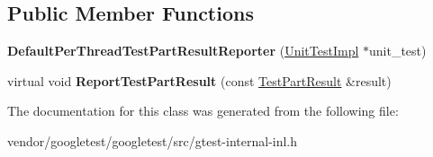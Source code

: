 \subsection*{Public Member Functions}
\begin{DoxyCompactItemize}
\item 
{\bfseries Default\+Per\+Thread\+Test\+Part\+Result\+Reporter} (\hyperlink{classtesting_1_1internal_1_1UnitTestImpl}{Unit\+Test\+Impl} $\ast$unit\+\_\+test)\hypertarget{classtesting_1_1internal_1_1DefaultPerThreadTestPartResultReporter_a968a846e5a90d2ffea8b2ce2746099bd}{}\label{classtesting_1_1internal_1_1DefaultPerThreadTestPartResultReporter_a968a846e5a90d2ffea8b2ce2746099bd}

\item 
virtual void {\bfseries Report\+Test\+Part\+Result} (const \hyperlink{classtesting_1_1TestPartResult}{Test\+Part\+Result} \&result)\hypertarget{classtesting_1_1internal_1_1DefaultPerThreadTestPartResultReporter_a7e1f4fa56b88fc4f07c75eedc2ca3013}{}\label{classtesting_1_1internal_1_1DefaultPerThreadTestPartResultReporter_a7e1f4fa56b88fc4f07c75eedc2ca3013}

\end{DoxyCompactItemize}


The documentation for this class was generated from the following file\+:\begin{DoxyCompactItemize}
\item 
vendor/googletest/googletest/src/gtest-\/internal-\/inl.\+h\end{DoxyCompactItemize}
